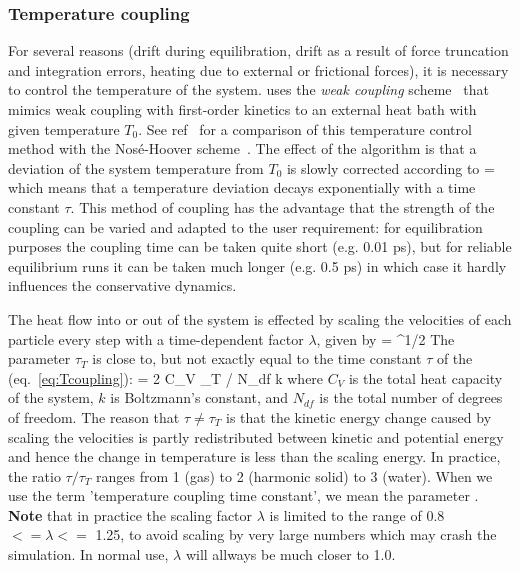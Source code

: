 \subsubsection{Temperature coupling}
For several reasons (drift during equilibration, drift as a result of
force truncation and integration errors, heating due to external or
frictional forces), it is necessary to control the temperature of the
system. \gromacs uses the {\em weak coupling} scheme~\cite{Berendsen84}
that mimics weak coupling with first-order kinetics to an external
heat bath with given temperature $T_0$. See ref~\cite{Berendsen91} for
a comparison of this temperature control method with the
Nos\'{e}-Hoover scheme~\cite{Nose84,Hoover85}. The effect of the algorithm is
that a deviation of the system temperature from $T_0$ is slowly
corrected according to
\beq
{} = 
\label{eq:Tcoupling}
\eeq
which means that a temperature deviation decays exponentially with a
time constant $\tau$.
This method of coupling has the advantage that the strength of the
coupling can be varied and adapted to the user requirement: for
equilibration purposes the coupling time can be taken quite short
(e.g. 0.01 ps), but for reliable equilibrium runs it can be taken much
longer (e.g. 0.5 ps) in which case it hardly influences the
conservative dynamics.
 
The heat flow into or out of the system is effected by scaling the
velocities of each particle every step with a time-dependent factor
$\lambda$, given by
\beq 
\lambda = ^{1/2}
\label{eq:lambda}
\eeq
The parameter $\tau_T$ is close to, but not exactly equal to the time constant
$\tau$ of the  (eq.~\ref{eq:Tcoupling}):
\beq
\tau = 2 C_V \tau_T / N_{df} k
\eeq
where $C_V$ is the total heat capacity of the system, $k$ is Boltzmann's
constant, and $N_{df}$ is the total number of degrees of freedom. The
reason that $\tau \neq \tau_T$ is that the kinetic energy change
caused by scaling the velocities is partly redistributed between
kinetic and potential energy and hence the change in temperature is
less than the scaling energy.  In practice, the ratio $\tau / \tau_T$
ranges from 1 (gas) to 2 (harmonic solid) to 3 (water). When we use
the term 'temperature coupling time constant', we mean the parameter
.  
{\bf Note} that in practice the scaling factor $\lambda$ is limited to 
the range of 0.8 $<= \lambda <=$ 1.25, to avoid scaling by very large
numbers which may crash the simulation. In normal use, 
$\lambda$ will allways be much closer to 1.0.
  
